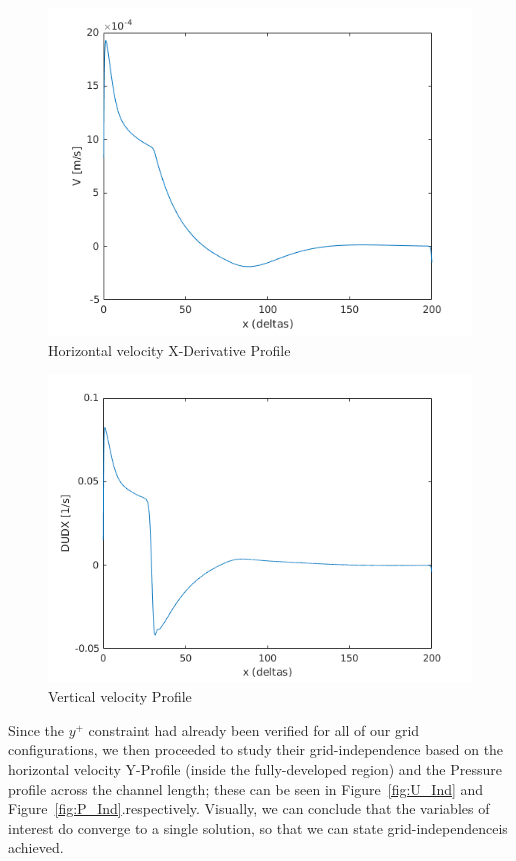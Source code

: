 \documentclass[12pt]{article}
\begin{document}
        \begin{figure}[ht!]
                \centering
                \includegraphics[width=\textwidth]{DUDX_Profile.png}
                \caption{Horizontal velocity X-Derivative Profile}
                \label{fig:DUDX_Profile}
        \end{figure}

        \begin{figure}[ht!]
                \centering
                \includegraphics[width=\textwidth]{V_Profile.png}
                \caption{Vertical velocity Profile}
                \label{fig:V_Profile}
        \end{figure}

        Since the \( y^+ \) constraint had already been verified for all of our grid configurations, we then proceeded to study their grid-independence based on the horizontal velocity Y-Profile (inside the fully-developed region) and the Pressure profile across the channel length; these can be seen in Figure~\ref{fig:U_Ind} and Figure~\ref{fig:P_Ind}.respectively. Visually, we can conclude that the variables of interest do converge to a single solution, so that we can state grid-independenceis achieved.
\end{document}
